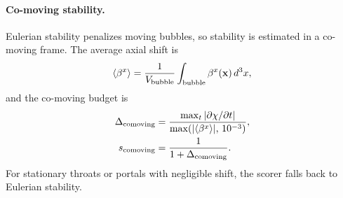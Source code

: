 \documentclass[twocolumn,floatfix,aps,prd,nofootinbib]{revtex4-2}
\begin{document}
\paragraph{Co-moving stability.}
Eulerian stability penalizes moving bubbles, so stability is estimated in a co-moving frame.  The average axial shift is
\begin{equation}
    \langle \beta^x \rangle = \frac{1}{V_{\rm bubble}} \int_{\rm bubble} \beta^x(\mathbf{x})\,d^3x,
\end{equation}
and the co-moving budget is
\begin{align}
    \Delta_{\rm comoving}
    &= \frac{\max_t \left| \partial \chi / \partial t \right|}
            {\max(|\langle \beta^x \rangle|,\,10^{-3})}, \notag\\
    s_{\rm comoving}
    &= \frac{1}{1 + \Delta_{\rm comoving}}.
    \label{eq:s_comoving}
\end{align}
For stationary throats or portals with negligible shift, the scorer falls back to Eulerian stability.
\end{document}
